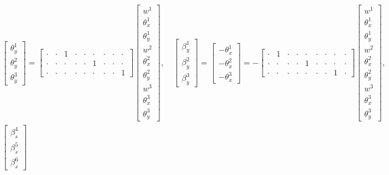 \documentclass[a4paper,10pt,fleqn]{article}
\begin{document}
\begin{gather}
\begin{bmatrix}
\theta_y^1\\\theta_y^2\\\theta_y^3
\end{bmatrix}=
\begin{bmatrix}
	\cdot & \cdot & 1     & \cdot & \cdot & \cdot & \cdot & \cdot & \cdot \\
	\cdot & \cdot & \cdot & \cdot & \cdot & 1     & \cdot & \cdot & \cdot \\
	\cdot & \cdot & \cdot & \cdot & \cdot & \cdot & \cdot & \cdot & 1
\end{bmatrix}\begin{bmatrix}
w^1\\\theta_x^1\\\theta_y^1\\w^2\\\theta_x^2\\\theta_y^2\\w^3\\\theta_x^3\\\theta_y^3
\end{bmatrix},\quad
\begin{bmatrix}
\beta_y^1\\\beta_y^2\\\beta_y^3
\end{bmatrix}=\begin{bmatrix}
-\theta_x^1\\-\theta_x^2\\-\theta_x^3
\end{bmatrix}=
-\begin{bmatrix}
	\cdot & 1     & \cdot & \cdot & \cdot & \cdot & \cdot & \cdot & \cdot \\
	\cdot & \cdot & \cdot & \cdot & 1     & \cdot & \cdot & \cdot & \cdot \\
	\cdot & \cdot & \cdot & \cdot & \cdot & \cdot & \cdot & 1     & \cdot
\end{bmatrix}\begin{bmatrix}
w^1\\\theta_x^1\\\theta_y^1\\w^2\\\theta_x^2\\\theta_y^2\\w^3\\\theta_x^3\\\theta_y^3
\end{bmatrix},\\
\begin{bmatrix}
\beta_s^4\\\beta_s^5\\\beta_s^6

\end{bmatrix}
\end{gather}
\end{document}
